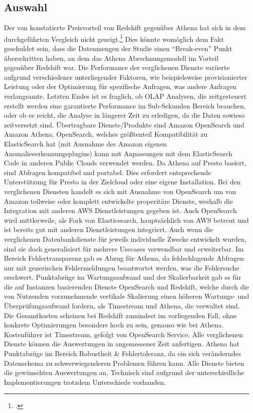 \subsection{Auswahl}
Der von \citeauthor{Tan.2019} konstatierte Preisvorteil von Redshift gegenüber Athena hat sich in dem durchgeführten Vergleich nicht gezeigt.\footcite[Vgl.][2178\psq]{Tan.2019} Dies könnte womöglich dem Fakt geschuldet sein, dass die Datenmengen der Studie einen \enquote{Break-even} Punkt überschritten haben, an dem das Athena Abrechnungsmodell im Vorteil gegenüber Redshift war.
Die Performance der verglichenen Dienste variierte aufgrund verschiedener unterliegender Faktoren, wie beispielsweise provisionierter Leistung oder der Optimierung für spezifische Anfragen, was andere Anfragen verlangsamte. Letzten Endes ist es fraglich, ob \ac{OLAP} Analysen, die zeitgesteuert erstellt werden eine garantierte Performance im Sub-Sekunden Bereich brauchen, oder ob es reicht, die Analyse in längerer Zeit zu erledigen, da die Daten sowieso zeitversetzt sind.
Übertragbare Dienste/Produkte sind Amazon OpenSearch und Amazon Athena. OpenSearch, welches größtenteil Kompatibilität zu ElasticSearch hat (mit Ausnahme des Amazon eigenen Anomalieeerkennungsplugins) kann mit Anpassungen mit dem ElasticSearch Code in anderen Public Clouds verwendet werden. Da Athena auf Presto basiert, sind Abfragen kompatibel und portabel. Dies erfordert entsprechende Unterstützung für Presto in der Zielcloud oder eine eigene Installation.
Bei den verglichenen Diensten handelt es sich mit Ausnahme von OpenSearch um von Amazon teilweise oder komplett entwickelte properitäre Dienste, weshalb die Integration mit anderen \ac{AWS} Dienstleistungen gegeben ist. Auch OpenSearch wird mittlerweile, als Fork von Elasticsearch, hauptsächlich von \ac{AWS} betreut und ist bereits gut mit anderen Dienstleistungen integriert.
Auch wenn die verglichenen Datenbankdienste für jeweils individuelle Zwecke entwickelt wurden, sind sie doch generalisiert für mehrere Usecases verwendbar und erweiterbar.
Im Bereich Fehlertransparenz gab es Abzug für Athena, da fehlschlagende Abfragen nur mit generischen Fehlermeldungen beantwortet werden, was die Fehlersuche erschwert.
Punktabzüge im Wartungsaufwand und der Skalierbarkeit gab es für die auf Instanzen basierenden Dienste OpenSearch und Redshift, welche durch die von Nutzenden vorzunehmende vertikale Skalierung einen höheren Wartungs- und Überprüfungsaufwand fordern, als Timestream und Athena, die verwaltet sind.
Die Gesamtkosten scheinen bei Redshift zumindest im vorliegenden Fall, ohne konkrete Optimierungen besonders hoch zu sein, genauso wie bei Athena. Kostenführer ist Timestream, gefolgt von OpenSearch Service.
Alle verglichenen Dienste können die Auswertungen in angemessener Zeit anfertigen. 
Athena hat Punktabzüge im Bereich Robustheit \& Fehlertoleranz, da ein sich veränderndes Datenschema zu schwerwiegenderen Problemen führen kann.
Alle Dienste bieten die gewünschten Auswertungen an. Technisch sind aufgrund der unterschiedliche Implementierungen trotzdem Unterschiede vorhanden.




